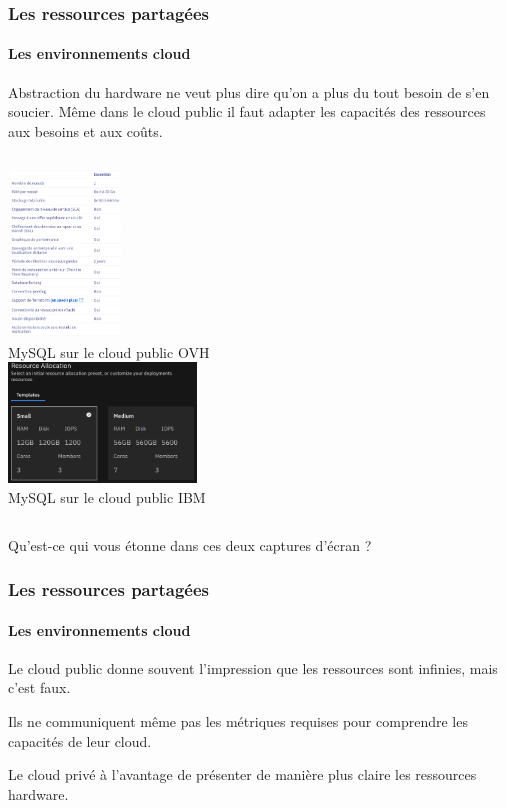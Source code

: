 \documentclass{beamer}
\begin{document}
    \begin{frame}
        \transdissolve
        \frametitle{Les ressources partagées}
        \framesubtitle{Les environnements cloud}
        \begin{dangercolorbox}
            Abstraction du hardware ne veut plus dire qu'on a plus du tout besoin de s'en soucier.
            Même dans le cloud public il faut adapter les capacités des ressources aux besoins et aux coûts.
        \end{dangercolorbox}
        \begin{columns}
            \centering
            \includegraphics[width=3cm]{image/ovh-public-mysql.png} \\ MySQL sur le cloud public OVH \\
            \centering
            \includegraphics[width=5cm]{image/ibm-public-mysql.png} \\ MySQL sur le cloud public IBM \\
        \end{columns}
        \flushleft
        \bigbreak
        Qu'est-ce qui vous étonne dans ces deux captures d'écran ?
    \end{frame}

    \begin{frame}
        \transdissolve
        \frametitle{Les ressources partagées}
        \framesubtitle{Les environnements cloud}

        Le cloud public donne souvent l'impression que les ressources sont infinies, mais c'est faux.

        Ils ne communiquent même pas les métriques requises pour comprendre les capacités de leur cloud.

        \bigbreak
        Le cloud privé à l'avantage de présenter de manière plus claire les ressources hardware.
    \end{frame}
\end{document}
